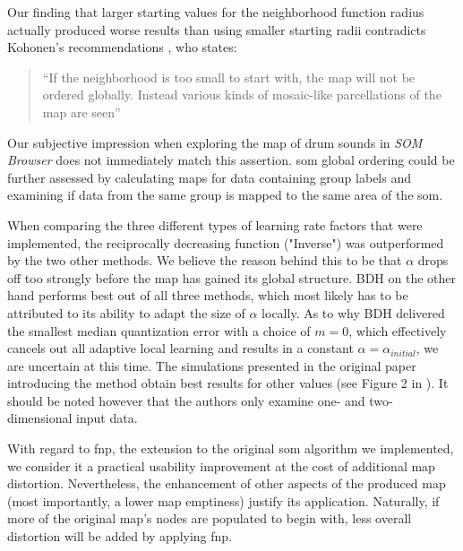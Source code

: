 \smallskip

Our finding that larger starting values for the neighborhood function radius
actually produced worse results than using smaller starting radii contradicts
Kohonen's recommendations \citep{kohonen1990}, who states:

\begin{quotation}
“If the neighborhood is too small to start with, the map will not be ordered
globally. Instead various kinds of mosaic-like parcellations of the map are
seen”
\end{quotation}

Our subjective impression when exploring the map of drum sounds in
\textit{SOM Browser} does not immediately match this assertion. \gls{som} global
ordering could be further assessed by calculating maps for data containing group
labels and examining if data from the same group is mapped to the same area of
the \gls{som}.

\smallskip

When comparing the three different types of learning rate factors that were
implemented, the reciprocally decreasing function ("Inverse") was outperformed
by the two other methods. We believe the reason behind this to be that $\alpha$
drops off too strongly before the map has gained its global structure. BDH on
the other hand performs best out of all three methods, which most likely has to
be attributed to its ability to adapt the size of $\alpha$ locally. As to why
BDH delivered the smallest median quantization error with a choice of $m = 0$,
which effectively cancels out all adaptive local learning and results in a
constant $\alpha = \alpha_{initial}$, we are uncertain at this time.
The simulations presented in the original paper introducing the method obtain
best results for other values (see Figure 2 in \citep[p.18]{bauer1996}).
It should be noted however that the authors only examine one- and two-
dimensional input data.

\smallskip

With regard to \gls{fnp}, the extension to the original \gls{som} algorithm we
implemented, we consider it a practical usability improvement at the cost of
additional map distortion. Nevertheless, the enhancement of other aspects of the
produced map (most importantly, a lower map emptiness) justify its application.
Naturally, if more of the original map's nodes are populated to begin with, less
overall distortion will be added by applying \gls{fnp}.

\bigskip

